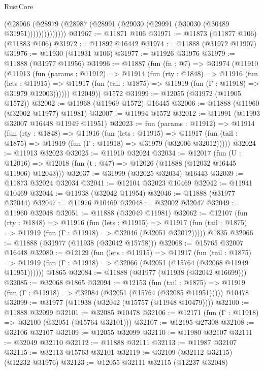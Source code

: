 \begin{lexlean}{RustCore}
\begin{coremodule}
                (@28966 (@28979 (@28987 (@28991 (@29030 (@29991 (@30030 (@30489 @31951))))))))))))))
@31967 := @11871 @106
@31971 := @11873 (@11877 @106) (@11883 @106)
@31972 := @11892 @16442
@31974 := @11888 (@31972 @11907)
@31976 := @11930 (@11931 @106)
@31977 := @11926 @31976
@31979 := @11888 (@31977 @11956)
@31996 := @11887
    (fun (fn : @7) =>
    @31974
      (@11910
        (@11913
          (fun (params : @11912) =>
          @11914
            (fun (rty : @1848) =>
            @11916
              (fun (lets : @11915) =>
              @11917 (fun (tail : @1875) => @11919 (fun (Γ : @11918) => @31979 @12003))))))
        @12049))
    @1572
@31999 := @12055 (@31972 (@11905 @1572))
@32002 := @11968 (@11969 @1572) @16445
@32006 := @11888 (@11960 (@32002 @11977) @11981)
@32007 := @11994 @1572
@32012 := @11991 (@11993 @32007 @16448 @11949 @11951)
@32023 := fun (params : @11912) =>
  @11914
    (fun (rty : @1848) =>
    @11916
      (fun (lets : @11915) =>
      @11917 (fun (tail : @1875) => @11919 (fun (Γ : @11918) => @31979 (@32006 @32012)))))
@32024 := @11913 @32023
@32025 := @11910 @32024
@32034 := @12017
    (fun (U : @12016) => @12018 (fun (t : @47) => @12026 (@11888 (@12032 @16445 @11906) @12043)))
@32037 := @31999 (@32025 @32034) @16443
@32039 := @11873 @32024 @32034
@32041 := @12104 @32023 @10469
@32042 := @11941 @10469
@32044 := @11938 (@32042 @11954)
@32046 := @11888 (@31977 @32044)
@32047 := @11976 @10469
@32048 := @32002 @32047
@32049 := @11960 @32048
@32051 := @11888 (@32049 @11981)
@32062 := @12107
    (fun (rty : @1848) =>
    @11916
      (fun (lets : @11915) =>
      @11917 (fun (tail : @1875) => @11919 (fun (Γ : @11918) => @32046 (@32051 @32012)))))
    @1835
@32066 := @11888 (@31977 (@11938 (@32042 @15758)))
@32068 := @15765 @32007 @16448
@32080 := @12129
    (fun (lets : @11915) =>
    @11917
      (fun (tail : @1875) =>
      @11919 (fun (Γ : @11918) => @32066 (@32051 (@15764 (@32068 @11949 @11951))))))
    @1865
@32084 := @11888 (@31977 (@11938 (@32042 @16699)))
@32085 := @32068 @1865
@32094 := @12153
    (fun (tail : @1875) => @11919 (fun (Γ : @11918) => @32084 (@32051 (@15764 (@32085 @11951)))))
    @10478
@32099 := @31977 (@11938 (@32042 (@15757 (@11948 @10479))))
@32100 := @11888 @32099
@32101 := @32085 @10478
@32106 := @12171 (fun (Γ : @11918) => @32100 (@32051 (@15764 @32101)))
@32107 := @12195 @27308
@32108 := @32106 @32107
@32109 := @12055 @32099
@32110 := @11980 @32107
@32111 := @32049 @32110
@32112 := @11888 @32111
@32113 := @11987 @32107
@32115 := @32113 @15763 @32101
@32119 := @32109 (@32112 @32115) (@12232 @31976)
@32123 := @12055 @32111 @32115 (@12237 @32048)

\end{coremodule}
\end{lexlean}
